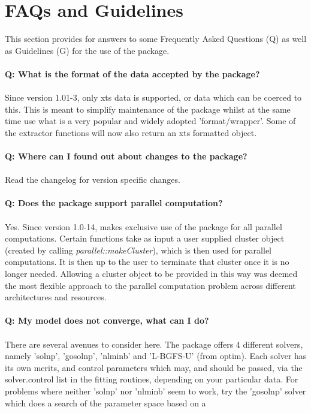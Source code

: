 \section{FAQs and Guidelines}\label{section:faqs}
This section provides for answers to some Frequently Asked Questions (Q) as well
as Guidelines (G) for the use of the \verb@rugarch@ package.\\
\\
\textbf{Q: What is the format of the data accepted by the package?}\\
\\
Since version 1.01-3, only xts data is supported, or data which can
be coerced to this. This is meant to simplify maintenance of the package
whilst at the same time use what is a very popular and widely adopted
'format/wrapper'. Some of the extractor functions will now also return
an xts formatted object.\\
\\
\textbf{Q: Where can I found out about changes to the package?}\\
\\
Read the changelog for version specific changes.\\
\\
\textbf{Q: Does the package support parallel computation?}\\
\\
Yes. Since version 1.0-14, \verb@rugarch@ makes exclusive use of the
\verb@parallel@ package for all parallel computations. Certain functions
take as input a user supplied cluster object (created by calling
\emph{parallel::makeCluster}), which is then used for parallel computations.
It is then up to the user to terminate that cluster once it is no longer
needed. Allowing a cluster object to be provided in this way was deemed the
most flexible approach to the parallel computation problem across different
architectures and resources.\\
\\
\textbf{Q: My model does not converge, what can I do?}\\
\\
There are several avenues to consider here. The package offers 4 different
solvers, namely 'solnp', 'gosolnp', 'nlminb' and 'L-BGFS-U' (from optim).
Each solver has its own merits, and control parameters which may, and should be
passed, via the solver.control list in the fitting routines, depending on your
particular data. For problems where neither 'solnp' nor 'nlminb' seem to work,
try the 'gosolnp' solver which does a search of the parameter space based on a
